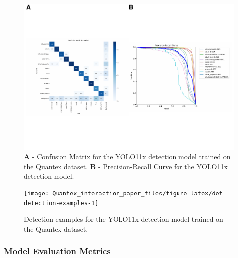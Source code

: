 \documentclass[
  man,floatsintext]{apa6}
\begin{document}
\begin{figure}

{\centering \includegraphics{Quantex_interaction_paper_files/figure-latex/det-metrics-1} 

}

\caption{\textbf{A} - Confusion Matrix for the YOLO11x detection model trained on the Quantex dataset. \textbf{B} - Precision-Recall Curve for the YOLO11x detection model.}\label{fig:det-metrics}
\end{figure}

\begin{figure}

{\centering \texttt{[image: Quantex\_interaction\_paper\_files/figure-latex/det-detection-examples-1]} 

}

\caption{Detection examples for the YOLO11x detection model trained on the Quantex dataset.}\label{fig:det-detection-examples}
\end{figure}

\subsubsection{Model Evaluation Metrics}\label{model-evaluation-metrics}
\end{document}
